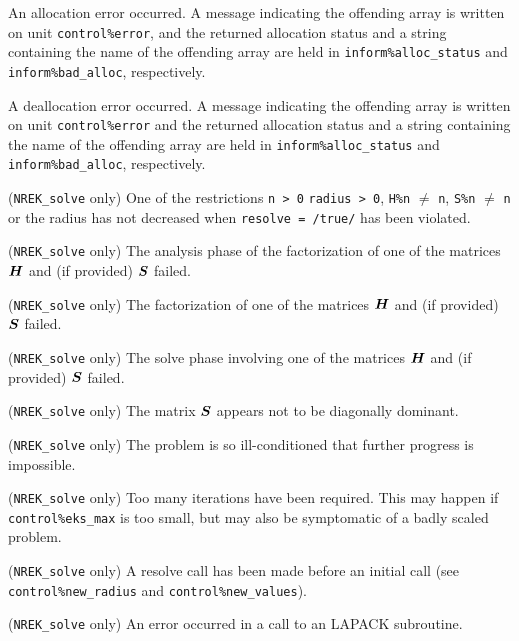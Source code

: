 \documentclass{galahad}
\newcommand{\packagename}{NREK}
\begin{document}
\begin{description}
 An allocation error occurred. A message indicating
the offending
array is written on unit {\tt control\%error}, and the returned allocation
status and a string containing the name of the offending array
are held in {\tt inform\%alloc\_\-status}
and {\tt inform\%bad\_alloc}, respectively.

 A deallocation error occurred.
A message indicating the offending
array is written on unit {\tt control\%error} and the returned allocation
status and a string containing the name of the offending array
are held in {\tt inform\%alloc\_\-status}
and {\tt inform\%bad\_alloc}, respectively.

 ({\tt \packagename\_solve} only)
One of the restrictions
{\tt n > 0}
{\tt radius > 0},
{\tt H\%n} $\neq$ {\tt n},
{\tt S\%n} $\neq$ {\tt n}
or the radius has not decreased when {\tt resolve = /true/}
has been violated.

 ({\tt \packagename\_solve} only)
The analysis phase of the factorization of one of the matrices 
${\bm{H}}$ and (if provided) ${\bm{S}}$ failed.

 ({\tt \packagename\_solve} only)
The factorization of one of the matrices 
${\bm{H}}$ and (if provided) ${\bm{S}}$ failed.

 ({\tt \packagename\_solve} only)
The solve phase involving one of the matrices 
${\bm{H}}$ and (if provided) ${\bm{S}}$ failed.

 ({\tt \packagename\_solve} only)
The matrix ${\bm{S}}$ appears not to be diagonally dominant.

 ({\tt \packagename\_solve} only)
The problem is so ill-conditioned that further progress is impossible.

 ({\tt \packagename\_solve} only)
Too many iterations have been required.  This may happen if
{\tt control\%eks\_max} is too small,
but may also be symptomatic of a badly scaled problem.

 ({\tt \packagename\_solve} only)
A resolve call has been made before an initial call (see 
{\tt control\%new\_radius} and {\tt control\%new\_values}).

 ({\tt \packagename\_solve} only)
An error occurred in a call to an LAPACK subroutine.

\end{description}
\end{document}
